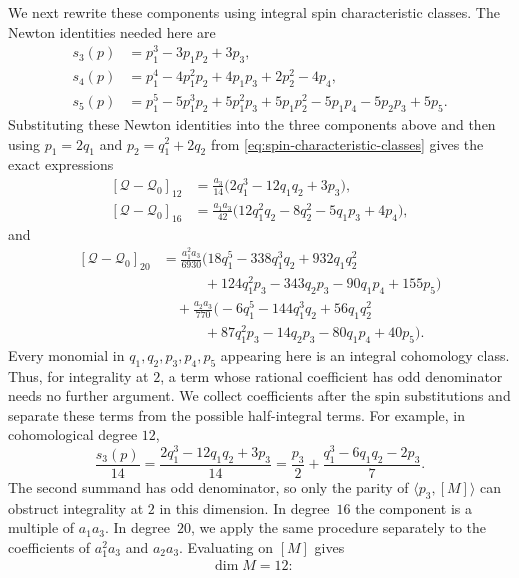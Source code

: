 \documentclass[14pt,dvipsnames]{extarticle}
\makeatletter
\numberwithin{equation}{subsection}
\theoremstyle{plain}
\theoremstyle{definition}
\theoremstyle{definition}
\renewenvironment{proof}[1][\proofname]{
 \par\pushQED{\qed}\normalfont
 \topsep6\p@\@plus6\p@\relax
 \trivlist\item[\hskip\labelsep\bfseries\itshape #1\@addpunct{.}]
}{\popQED\endtrivlist\@endpefalse}
\makeatother
\begin{document}
\begin{proof}[Proof of \cref{thm:bc-spin-below24}]
We next rewrite these components using integral spin characteristic
classes. The Newton identities needed here are
\[
 \begin{aligned}
  s_3(p)&=p_1^3-3p_1p_2+3p_3,\\
  s_4(p)&=p_1^4-4p_1^2p_2+4p_1p_3+2p_2^2-4p_4,\\
  s_5(p)&=p_1^5-5p_1^3p_2+5p_1^2p_3+5p_1p_2^2
          -5p_1p_4-5p_2p_3+5p_5.
 \end{aligned}
\]
Substituting these Newton identities into the three components above and
then using $p_1=2q_1$ and $p_2=q_1^2+2q_2$ from
\eqref{eq:spin-characteristic-classes} gives the exact expressions
\[
 \begin{aligned}
  [\mathcal Q-\mathcal Q_0]_{12}
   &=\frac{a_3}{14}\bigl(2q_1^3-12q_1q_2+3p_3\bigr),\\[4pt]
  [\mathcal Q-\mathcal Q_0]_{16}
   &=\frac{a_1a_3}{42}
     \bigl(12q_1^2q_2-8q_2^2-5q_1p_3+4p_4\bigr),
 \end{aligned}
\]
and
\[
 \begin{aligned}
  [\mathcal Q-\mathcal Q_0]_{20}
   &=\frac{a_1^2a_3}{6930}
     \bigl(18q_1^5-338q_1^3q_2+932q_1q_2^2\\
   &\hspace{3em}{}+124q_1^2p_3-343q_2p_3-90q_1p_4+155p_5\bigr)\\[4pt]
   &\quad+\frac{a_2a_3}{770}
     \bigl(-6q_1^5-144q_1^3q_2+56q_1q_2^2\\
   &\hspace{3em}{}+87q_1^2p_3-14q_2p_3-80q_1p_4+40p_5\bigr).
 \end{aligned}
\]
Every monomial in $q_1,q_2,p_3,p_4,p_5$ appearing here is an integral
cohomology class. Thus, for integrality
at $2$, a term whose rational coefficient has odd denominator needs no
further argument. We collect coefficients after the spin substitutions
and separate these terms from the possible half-integral terms.
For example, in cohomological degree $12$,
\[
 \frac{s_3(p)}{14}
 =\frac{2q_1^3-12q_1q_2+3p_3}{14}
 =\frac{p_3}{2}
  +\frac{q_1^3-6q_1q_2-2p_3}{7}.
\]
The second summand has odd denominator, so only the parity of
$\langle p_3,[M]\rangle$ can obstruct integrality at $2$ in this dimension.
In degree~$16$ the component is a multiple of $a_1a_3$. In degree~$20$,
we apply the same procedure separately to the coefficients of $a_1^2a_3$
and $a_2a_3$. Evaluating on $[M]$ gives
\begin{equation}\label{eq:spin-half-obstructions}
\begin{aligned}
 \dim M=12:\quad

\end{aligned}
\end{equation}
\end{proof}
\end{document}
